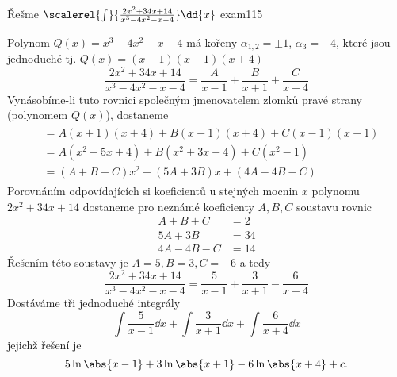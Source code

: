 \begin{mathexam}{Řešme \(\protect\scalerel{\int}{\frac{2x^2+34x+14}{x^3-4x^2-x-4}}\dd{x}\)
  \hfill\cite[s.~90]{Knichal}}{exam115}
    
    Polynom $Q(x)=x^3-4x^2-x-4$ má kořeny $\alpha_{1,2}=\pm1$, $\alpha_{3}=-4$, které jsou
    jednoduché tj. $Q(x)=(x-1)(x+1)(x+4)$ $$\frac{2x^2+34x+14}{x^3-4x^2-x-4} =
    \frac{A}{x-1}+\frac{B}{x+1}+\frac{C}{x+4}$$ Vynásobíme-li tuto rovnici společným jmenovatelem
    zlomků pravé strany (polynomem $Q(x)$), dostaneme
    \begin{gather*}
        \begin{align*}
          &= A(x+1)(x+4) + B(x-1)(x+4) + C(x-1)(x+1) \\
          &= A(x^2+5x+4) + B(x^2+3x-4) + C(x^2-1)    \\
          &= (A+B+C)x^2  + (5A+3B)x    + (4A-4B-C)
        \end{align*}
    \end{gather*}
    Porovnáním odpovídajících si koeficientů u stejných mocnin \(x\) polynomu \(2x^2+34x+14\)
    dostaneme pro nez\-ná\-mé koeficienty $A, B, C$ soustavu rovnic
    \begin{align*}
       A+   B + C &= 2 \\
      5A + 3B     &= 34 \\
      4A - 4B - C &= 14
    \end{align*}
    Řešením této soustavy je $A = 5, B = 3, C = -6$ a tedy
    $$\frac{2x^2+34x+14}{x^3-4x^2-x-4} = \frac{5}{x-1}+\frac{3}{x+1}-\frac{6}{x+4}$$
    Dostáváme tři jednoduché integrály
    \begin{equation*}
      \int{\frac{5}{x-1}}\dd{x} + \int{\frac{3}{x+1}}\dd{x} + \int{\frac{6}{x+4}}\dd{x}            
    \end{equation*}
    jejichž řešení je 
    \begin{equation*}
      5\ln\abs{x-1} +  3\ln\abs{x+1} - 6\ln\abs{x+4} +c.
    \end{equation*}
\end{mathexam}